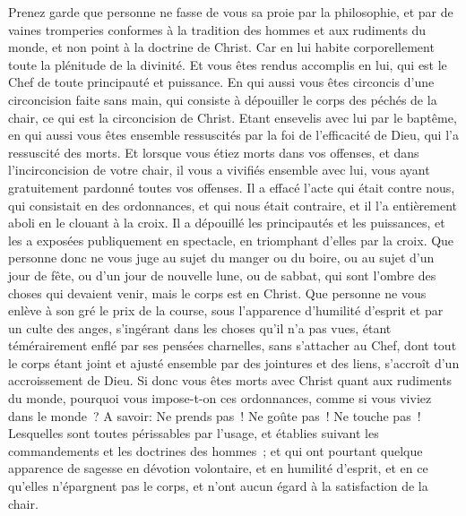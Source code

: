 \begin{multicols}{2}
Prenez garde que personne ne fasse de vous sa proie par la philosophie, et par de vaines tromperies conformes à la tradition des hommes et aux rudiments du monde, et non point à la doctrine de Christ.
Car en lui habite corporellement toute la plénitude de la divinité.
Et vous êtes rendus accomplis en lui, qui est le Chef de toute principauté et puissance.
En qui aussi vous êtes circoncis d'une circoncision faite sans main, qui consiste à dépouiller le corps des péchés de la chair, ce qui est la circoncision de Christ.
Etant ensevelis avec lui par le baptême, en qui aussi vous êtes ensemble ressuscités par la foi de l'efficacité de Dieu, qui l'a ressuscité des morts.
Et lorsque vous étiez morts dans vos offenses, et dans l'incirconcision de votre chair, il vous a vivifiés ensemble avec lui, vous ayant gratuitement pardonné toutes vos offenses.
Il a effacé l'acte qui était contre nous, qui consistait en des ordonnances, et qui nous était contraire, et il l'a entièrement aboli en le clouant à la croix.
Il a dépouillé les principautés et les puissances, et les a exposées publiquement en spectacle, en triomphant d'elles par la croix.
Que personne donc ne vous juge au sujet du manger ou du boire, ou au sujet d'un jour de fête, ou d'un jour de nouvelle lune, ou de sabbat,
qui sont l'ombre des choses qui devaient venir, mais le corps est en Christ.
Que personne ne vous enlève à son gré le prix de la course, sous l'apparence d'humilité d'esprit et par un culte des anges, s'ingérant dans les choses qu'il n'a pas vues, étant témérairement enflé par ses pensées charnelles,
sans s'attacher au Chef, dont tout le corps étant joint et ajusté ensemble par des jointures et des liens, s'accroît d'un accroissement de Dieu.
Si donc vous êtes morts avec Christ quant aux rudiments du monde, pourquoi vous impose-t-on ces ordonnances, comme si vous viviez dans le monde~?
A savoir: Ne prends pas~! Ne goûte pas~! Ne touche pas~!
Lesquelles sont toutes périssables par l'usage, et établies suivant les commandements et les doctrines des hommes~; 
et qui ont pourtant quelque apparence de sagesse en dévotion volontaire, et en humilité d'esprit, et en ce qu'elles n'épargnent pas le corps, et n'ont aucun égard à la satisfaction de la chair.

\end{multicols}

